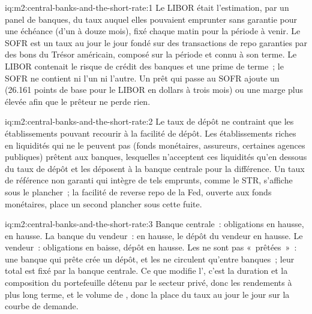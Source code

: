 \begin{solution}{iq:m2:central-banks-and-the-short-rate:1}
Le LIBOR était l'estimation, par un panel de banques, du taux auquel elles pouvaient emprunter
sans garantie pour une échéance (d'un à douze mois), fixé chaque matin pour la période
à venir. Le SOFR est un taux au jour le jour fondé sur des transactions de repo garanties
par des bons du Trésor américain, composé sur la période et connu à son terme. Le LIBOR
contenait le risque de crédit des banques et une prime de terme~; le SOFR ne contient ni l'un ni l'autre. Un prêt qui
passe au SOFR ajoute un  (26.161 points de base pour le LIBOR en dollars à trois mois) ou une
marge plus élevée afin que le prêteur ne perde rien.
\end{solution}

\begin{solution}{iq:m2:central-banks-and-the-short-rate:2}
Le taux de dépôt ne contraint que les établissements pouvant recourir à la facilité de dépôt.
Les établissements riches en liquidités qui ne le peuvent pas (fonds monétaires, assureurs, certaines
agences publiques) prêtent aux banques, lesquelles n'acceptent ces liquidités qu'en dessous du
taux de dépôt et les déposent à la banque centrale pour la différence. Un
taux de référence non garanti qui intègre de tels emprunts, comme le \texteuro STR, s'affiche
sous le plancher~; la facilité de reverse repo de la Fed, ouverte aux fonds monétaires, place un
second plancher sous cette fuite.
\end{solution}

\begin{solution}{iq:m2:central-banks-and-the-short-rate:3}
Banque centrale~: obligations en hausse,  en hausse. La banque du vendeur~:  en hausse, le
dépôt du vendeur en hausse. Le vendeur~: obligations en baisse, dépôt en hausse. Les  ne sont pas
«~prêtées~»~: une banque qui prête crée un dépôt, et les  ne circulent
qu'entre banques~; leur total est fixé par la banque centrale. Ce que modifie l', c'est la
duration et la composition du portefeuille détenu par le secteur privé, donc les rendements à plus long terme,
et le volume de , donc la place du taux au jour le jour sur la courbe de
demande.
\end{solution}

